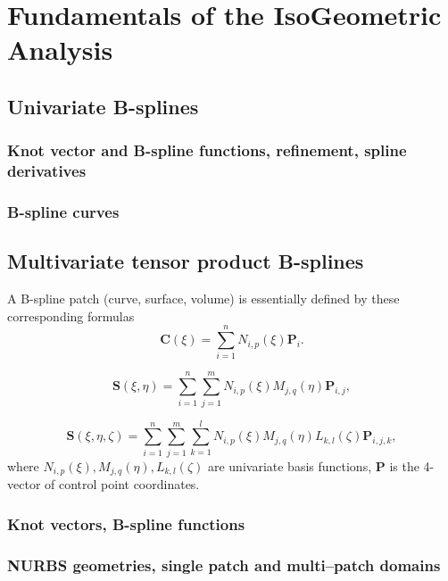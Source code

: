 \let\clearforchapter\par %
\chapter{Fundamentals of the IsoGeometric Analysis} 

\section{Univariate B-splines}

\subsection{Knot vector and B-spline functions, refinement, spline derivatives}

\subsection{B-spline curves}

\section{Multivariate tensor product B-splines}
A B-spline patch (curve, surface, volume) is essentially defined by these corresponding formulas
\begin{equation}
    \mathbf{C}(\xi) = \sum_{i = 1}^{n} N_{i,p}(\xi) \mathbf{P}_i.
\end{equation}

\begin{equation}
    \mathbf{S}(\xi,\eta)=\sum_{i=1}^n \sum_{j=1}^m N_{i,p}(\xi) M_{j,q}(\eta) \mathbf{P}_{i,j},
\end{equation}

\begin{equation}
    \mathbf{S}(\xi,\eta, \zeta)=\sum_{i=1}^n \sum_{j=1}^m \sum_{k=1}^l N_{i,p}(\xi) M_{j,q}(\eta) L_{k,l}(\zeta) \mathbf{P}_{i,j,k},
\end{equation}
where $N_{i,p}(\xi), M_{j,q}(\eta), L_{k,l}(\zeta)$ are univariate basis functions, $\mathbf{P}$ is the 4-vector of control point coordinates.
\subsection{Knot vectors, B-spline functions}

\subsection{NURBS geometries, single patch and multi--patch domains}

